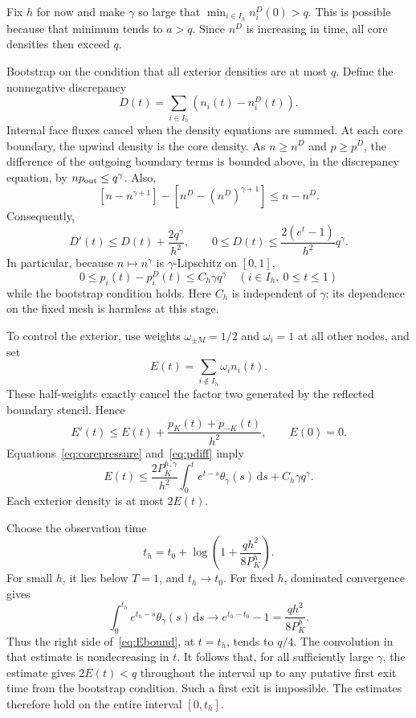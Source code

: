 \documentclass[11pt,a4paper]{article}
\theoremstyle{remark}
\newcommand{\dd}{\,\mathrm d}
\begin{document}
Fix $h$ for now and make $\gamma$ so large that $\min_{i\in I_h}n_i^D(0)>q$. This is possible because that minimum tends to $a>q$. Since $n^D$ is increasing in time, all core densities then exceed $q$.

Bootstrap on the condition that all exterior densities are at most $q$. Define the nonnegative discrepancy
\[
 D(t)=\sum_{i\in I_h}(n_i(t)-n_i^D(t)).
\]
Internal face fluxes cancel when the density equations are summed. At each core boundary, the upwind density is the core density. As $n\ge n^D$ and $p\ge p^D$, the difference of the outgoing boundary terms is bounded above, in the discrepancy equation, by $n p_{\rm out}\le q^\gamma$. Also,
\[
 [n-n^{\gamma+1}]-[n^D-(n^D)^{\gamma+1}]\le n-n^D.
\]
Consequently,
\begin{equation}\label{eq:D-bound}
 D'(t)\le D(t)+\frac{2q^\gamma}{h^2},\qquad
 0\le D(t)\le \frac{2(e^t-1)}{h^2}q^\gamma.
\end{equation}
In particular, because $n\mapsto n^\gamma$ is $\gamma$-Lipschitz on $[0,1]$,
\begin{equation}\label{eq:pdiff}
 0\le p_i(t)-p_i^D(t)\le C_h\gamma q^\gamma\quad(i\in I_h,
 \ 0\le t\le1)
\end{equation}
while the bootstrap condition holds. Here $C_h$ is independent of $\gamma$; its dependence on the fixed mesh is harmless at this stage.

To control the exterior, use weights $\omega_{\pm M}=1/2$ and $\omega_i=1$ at all other nodes, and set
\[
 E(t)=\sum_{i\notin I_h}\omega_i n_i(t).
\]
These half-weights exactly cancel the factor two generated by the reflected boundary stencil. Hence
\[
 E'(t)\le E(t)+\frac{p_K(t)+p_{-K}(t)}{h^2},\qquad E(0)=0.
\]
Equations~\eqref{eq:corepressure} and~\eqref{eq:pdiff} imply
\begin{equation}\label{eq:Ebound}
 E(t)\le \frac{2P_K^{h,\gamma}}{h^2}
 \int_0^t e^{t-s}\theta_\gamma(s)\dd s+C_h\gamma q^\gamma.
\end{equation}
Each exterior density is at most $2E(t)$.

Choose the observation time
\begin{equation}\label{eq:th}
 t_h=t_0+\log\left(1+\frac{q h^2}{8P_K^h}\right).
\end{equation}
For small $h$, it lies below $T=1$, and $t_h\to t_0$. For fixed $h$, dominated convergence gives
\[
 \int_0^{t_h}e^{t_h-s}\theta_\gamma(s)\dd s
 \longrightarrow e^{t_h-t_0}-1=\frac{q h^2}{8P_K^h}.
\]
Thus the right side of~\eqref{eq:Ebound}, at $t=t_h$, tends to $q/4$. The convolution in that estimate is nondecreasing in $t$. It follows that, for all sufficiently large $\gamma$, the estimate gives $2E(t)<q$ throughout the interval up to any putative first exit time from the bootstrap condition. Such a first exit is impossible. The estimates therefore hold on the entire interval $[0,t_h]$.
\end{document}
